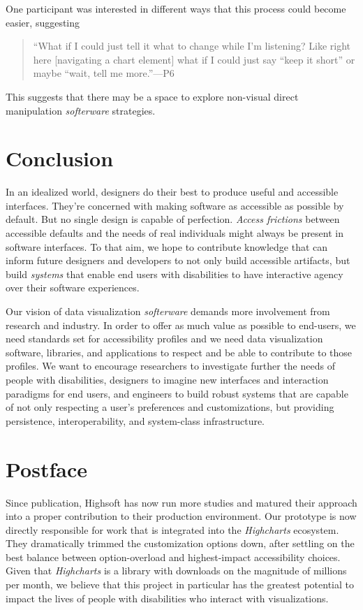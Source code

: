 \documentclass[12pt]{cmuthesis}
\begin{document}
One participant was interested in different ways that this process could become easier, suggesting

\begin{quote}
    ``What if I could just tell it what to change while I'm listening? Like right here [navigating a chart element] what if I could just say ``keep it short'' or maybe ``wait, tell me more.''---P6
\end{quote}

This suggests that there may be a space to explore non-visual direct manipulation \textit{softerware} strategies.

\section{Conclusion}
In an idealized world, designers do their best to produce useful and accessible interfaces. They're concerned with making software as accessible as possible by default. But no single design is capable of perfection. \textit{Access frictions} between accessible defaults and the needs of real individuals might always be present in software interfaces. To that aim, we hope to contribute knowledge that can inform future designers and developers to not only build accessible artifacts, but build \textit{systems} that enable end users with disabilities to have interactive agency over their software experiences.

Our vision of data visualization \textit{softerware} demands more involvement from research and industry. In order to offer as much value as possible to end-users, we need standards set for accessibility profiles and we need data visualization software, libraries, and applications to respect and be able to contribute to those profiles. We want to encourage researchers to investigate further the needs of people with disabilities, designers to imagine new interfaces and interaction paradigms for end users, and engineers to build robust systems that are capable of not only respecting a user's preferences and customizations, but providing persistence, interoperability, and system-class infrastructure.

\newpage

\section{Postface}

Since publication, Highsoft has now run more studies and matured their approach into a proper contribution to their production environment. Our prototype is now directly responsible for work that is integrated into the \textit{Highcharts} ecosystem. They dramatically trimmed the customization options down, after settling on the best balance between option-overload and highest-impact accessibility choices. Given that \textit{Highcharts} is a library with downloads on the magnitude of millions per month, we believe that this project in particular has the greatest potential to impact the lives of people with disabilities who interact with visualizations.
\end{document}

